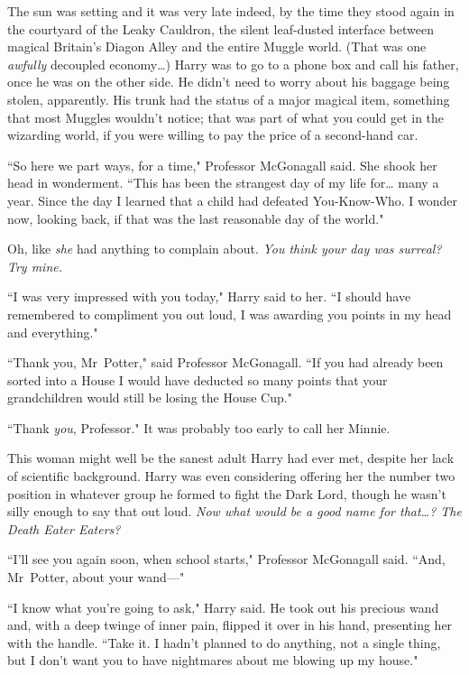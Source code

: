 \later

The sun was setting and it was very late indeed, by the time they stood again in the courtyard of the Leaky Cauldron, the silent leaf-dusted interface between magical Britain's Diagon Alley and the entire Muggle world. (That was one \emph{awfully} decoupled economy{\ldots}) Harry was to go to a phone box and call his father, once he was on the other side. He didn't need to worry about his baggage being stolen, apparently. His trunk had the status of a major magical item, something that most Muggles wouldn't notice; that was part of what you could get in the wizarding world, if you were willing to pay the price of a second-hand car.

``So here we part ways, for a time," Professor McGonagall said. She shook her head in wonderment. ``This has been the strangest day of my life for{\ldots} many a year. Since the day I learned that a child had defeated You-Know-Who. I wonder now, looking back, if that was the last reasonable day of the world."

Oh, like \emph{she} had anything to complain about. \emph{You think your day was surreal? Try mine.}

``I was very impressed with you today," Harry said to her. ``I should have remembered to compliment you out loud, I was awarding you points in my head and everything."

``Thank you, Mr~Potter," said Professor McGonagall. ``If you had already been sorted into a House I would have deducted so many points that your grandchildren would still be losing the House Cup."

``Thank \emph{you}, Professor." It was probably too early to call her Minnie.

This woman might well be the sanest adult Harry had ever met, despite her lack of scientific background. Harry was even considering offering her the number two position in whatever group he formed to fight the Dark Lord, though he wasn't silly enough to say that out loud. \emph{Now what would be a good name for that{\ldots}? The Death Eater Eaters?}

``I'll see you again soon, when school starts," Professor McGonagall said. ``And, Mr~Potter, about your wand—"

``I know what you're going to ask," Harry said. He took out his precious wand and, with a deep twinge of inner pain, flipped it over in his hand, presenting her with the handle. ``Take it. I hadn't planned to do anything, not a single thing, but I don't want you to have nightmares about me blowing up my house."

